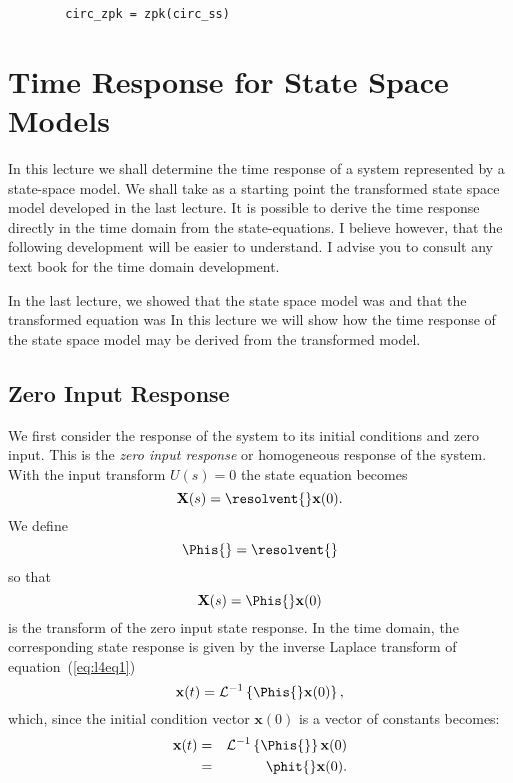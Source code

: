 \begin{slide}
	\begin{verbatim}
		circ_zpk = zpk(circ_ss)
	\end{verbatim}
\end{slide}


\section*{Time Response for State Space Models} %
\label{sec:time_response_for_state_space_models}

In this lecture we shall determine the time response of a system
represented by a state-space model. We shall take as a starting
point the transformed state space model developed in the last
lecture. It is possible to derive the time response directly in
the time domain from the state-equations. I believe however, that
the following development will be easier to understand. I advise
you to consult any text book for the time domain development.

In the last lecture, we showed that the state space model was
\ssmodeltd{} and that the transformed equation was  \ssmodelfd{}
In this lecture we will show how the time response of the state
space model may be derived from the transformed model.

\subsection*{Zero Input Response}
\label{ssec:zero_input_response} We first consider the response of
the system to its initial conditions and zero input. This is the
\emph{zero input response} or homogeneous response of the system.
With the input transform $U(s)=0$ the state equation becomes
\[\mathbf{X}(s)=\resolvent{}\mathbf{x}(0).\] We define
\[\Phis{} = \resolvent{}\] so that
\begin{equation}\label{eq:l4eq1}
\mathbf{X}(s)=\Phis{}\mathbf{x}(0)
\end{equation} is the
transform of the zero input state response. In the time domain,
the corresponding state response is given by the inverse Laplace
transform of equation~(\ref{eq:l4eq1})
\begin{equation}
\label{eq:l4eq2} \mathbf{x}(t) = \mathcal{L}^{-1}
\left\{\Phis{}\mathbf{x}(0)\right\},\end{equation} which, since
the initial condition vector $\mathbf{x}(0)$ is a vector of
constants becomes:
\begin{eqnarray}
\mathbf{x}(t) & = & \mathcal{L}^{-1}
\left\{\Phis{}\right\}\mathbf{x}(0)\nonumber \\ & = &
\phit{}\mathbf{x}(0).\label{eq:l4eq3}
\end{eqnarray}
